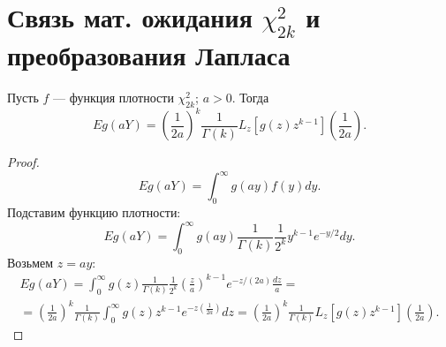 \section{Связь мат. ожидания $\chi^2_{2k}$ и преобразования Лапласа}
%
\begin{Th*}
Пусть $f$ --- функция плотности $\chi^2_{2k}$; $a > 0$. Тогда
\[
    Eg(aY) = \left(\frac{1}{2a}\right)^k \frac{1}{\Gamma(k)} L_z \left[ g(z) z^{k-1}  \right] \left( \frac{1}{2a} \right) 
.\]
\end{Th*}
\begin{proof}
\[
    Eg(aY) = \int_{0}^{\infty} g(ay) f(y) dy  
.\]
Подставим функцию плотности:
\[
    Eg(aY) = \int_{0}^{\infty} g(ay) \frac{1}{\Gamma(k)} \frac{1}{2^k} y^{k-1} e^{-y/2} dy 
.\]
Возьмем $z = ay$:
\begin{multline*}
    Eg(aY) = \int_{0}^{\infty} g(z) \frac{1}{\Gamma(k)} \frac{1}{2^k} \left( \frac{z}{a} \right)^{k-1} e^{-z/(2a)} \frac{dz}{a}
=\\=
    \left( \frac{1}{2a} \right)^k \frac{1}{\Gamma(k)} \int_{0}^{\infty} g(z) z^{k-1} e^{-z \left( \frac{1}{2a} \right) } dz = 
    \left( \frac{1}{2a} \right)^k \frac{1}{\Gamma(k)} L_z \left[ g(z) z^{k-1} \right] \left( \frac{1}{2a} \right) 
.\end{multline*}
\end{proof}
